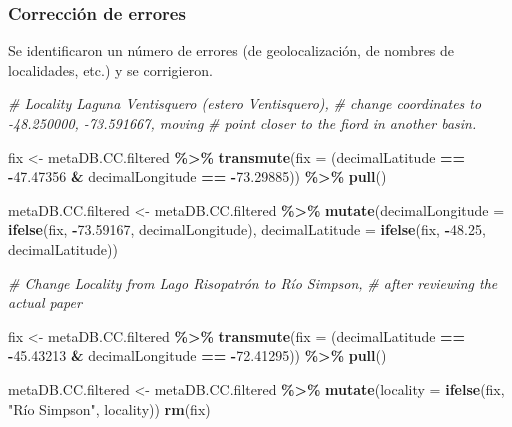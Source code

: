 \documentclass[sn-apa,pdflatex]{sn-jnl}
\newenvironment{Shaded}{\begin{snugshade}}{\end{snugshade}}
\newcommand{\AttributeTok}[1]{\textcolor[rgb]{0.13,0.29,0.53}{#1}}
\newcommand{\CommentTok}[1]{\textcolor[rgb]{0.56,0.35,0.01}{\textit{#1}}}
\newcommand{\FloatTok}[1]{\textcolor[rgb]{0.00,0.00,0.81}{#1}}
\newcommand{\FunctionTok}[1]{\textcolor[rgb]{0.13,0.29,0.53}{\textbf{#1}}}
\newcommand{\NormalTok}[1]{#1}
\newcommand{\OtherTok}[1]{\textcolor[rgb]{0.56,0.35,0.01}{#1}}
\newcommand{\SpecialCharTok}[1]{\textcolor[rgb]{0.81,0.36,0.00}{\textbf{#1}}}
\newcommand{\StringTok}[1]{\textcolor[rgb]{0.31,0.60,0.02}{#1}}
\begin{document}
\subsubsection{Corrección de errores}\label{correcciuxf3n-de-errores}

Se identificaron un número de errores (de geolocalización, de nombres de
localidades, etc.) y se corrigieron.

\begin{Shaded}
\begin{Highlighting}[]
\CommentTok{\# Locality \textquotesingle{}Laguna Ventisquero (estero Ventisquero)\textquotesingle{},}
\CommentTok{\# change coordinates to {-}48.250000, {-}73.591667, moving}
\CommentTok{\# point closer to the fiord in another basin.}

\NormalTok{fix }\OtherTok{\textless{}{-}}\NormalTok{ metaDB.CC.filtered }\SpecialCharTok{\%\textgreater{}\%}
    \FunctionTok{transmute}\NormalTok{(}\AttributeTok{fix =}\NormalTok{ (decimalLatitude }\SpecialCharTok{==} \SpecialCharTok{{-}}\FloatTok{47.47356} \SpecialCharTok{\&}\NormalTok{ decimalLongitude }\SpecialCharTok{==}
        \SpecialCharTok{{-}}\FloatTok{73.29885}\NormalTok{)) }\SpecialCharTok{\%\textgreater{}\%}
    \FunctionTok{pull}\NormalTok{()}

\NormalTok{metaDB.CC.filtered }\OtherTok{\textless{}{-}}\NormalTok{ metaDB.CC.filtered }\SpecialCharTok{\%\textgreater{}\%}
    \FunctionTok{mutate}\NormalTok{(}\AttributeTok{decimalLongitude =} \FunctionTok{ifelse}\NormalTok{(fix, }\SpecialCharTok{{-}}\FloatTok{73.59167}\NormalTok{, decimalLongitude),}
        \AttributeTok{decimalLatitude =} \FunctionTok{ifelse}\NormalTok{(fix, }\SpecialCharTok{{-}}\FloatTok{48.25}\NormalTok{, decimalLatitude))}

\CommentTok{\# Change Locality from Lago Risopatrón to Río Simpson,}
\CommentTok{\# after reviewing the actual paper}

\NormalTok{fix }\OtherTok{\textless{}{-}}\NormalTok{ metaDB.CC.filtered }\SpecialCharTok{\%\textgreater{}\%}
    \FunctionTok{transmute}\NormalTok{(}\AttributeTok{fix =}\NormalTok{ (decimalLatitude }\SpecialCharTok{==} \SpecialCharTok{{-}}\FloatTok{45.43213} \SpecialCharTok{\&}\NormalTok{ decimalLongitude }\SpecialCharTok{==}
        \SpecialCharTok{{-}}\FloatTok{72.41295}\NormalTok{)) }\SpecialCharTok{\%\textgreater{}\%}
    \FunctionTok{pull}\NormalTok{()}

\NormalTok{metaDB.CC.filtered }\OtherTok{\textless{}{-}}\NormalTok{ metaDB.CC.filtered }\SpecialCharTok{\%\textgreater{}\%}
    \FunctionTok{mutate}\NormalTok{(}\AttributeTok{locality =} \FunctionTok{ifelse}\NormalTok{(fix, }\StringTok{"Río Simpson"}\NormalTok{, locality))}
\FunctionTok{rm}\NormalTok{(fix)}


\end{Highlighting}
\end{Shaded}
\end{document}
